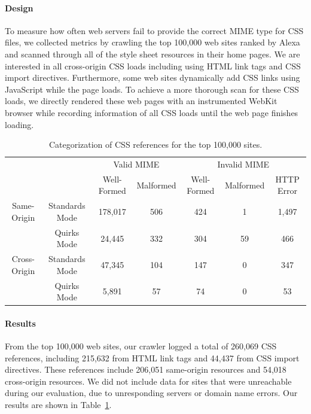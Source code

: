 \documentclass{acm_proc_article-sp}
\begin{document}
\paragraph{Design}
To measure how often web servers fail to provide the correct MIME type for CSS files, we collected metrics by crawling the top 100,000 web sites ranked by Alexa~\cite{alexa} and scanned through all of the style sheet resources in their home pages. We are interested in all cross-origin CSS loads including using HTML link tags and CSS import directives. Furthermore, some web sites dynamically add CSS links using JavaScript while the page loads. To achieve a more thorough scan for these CSS loads, we directly rendered these web pages with an instrumented WebKit browser while recording information of all CSS loads until the web page finishes loading.

\begin{table}
\centering
\begin{tabular}{|c|c|c|c|c|c|c|} \hline
\multicolumn{2}{|c|}{}&\multicolumn{2}{|c|}{Valid MIME}&\multicolumn{3}{|c|}{Invalid MIME}\\
\cline{3-7}\multicolumn{2}{|c|}{}&Well-Formed&Malformed&Well-Formed&Malformed&HTTP Error\\ \hline
Same-Origin&Standards Mode&178,017&506&424&1&1,497\\ 
\cline{2-7}&Quirks Mode&24,445&332&304&59&466\\ \hline
Cross-Origin&Standards Mode&47,345&104&147&0&347\\
\cline{2-7}&Quirks Mode&5,891&57&74&0&53\\ \hline
\end{tabular}
\caption{Categorization of CSS references for the top 100,000 sites.}
\label{table:results}
\end{table}

\paragraph{Results}
From the top 100,000 web sites, our crawler logged a total of 260,069 CSS references, including 215,632 from HTML link tags and 44,437 from CSS import directives. These references include 206,051 same-origin resources and 54,018 cross-origin resources. We did not include data for sites that were unreachable during our evaluation, due to unresponding servers or domain name errors. Our results are shown in Table~\ref{table:results}.
\end{document}
